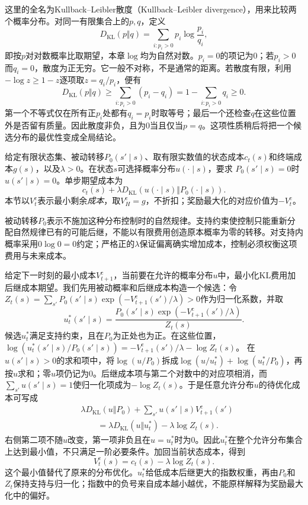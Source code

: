 这里的全名为Kullback--Leibler散度（Kullback--Leibler divergence），用来比较两个概率分布。对同一有限集合上的$p,q$，定义
\[
 D_{\mathrm{KL}}(p\Vert q)
 =\sum_{i:p_i>0}p_i\log\frac{p_i}{q_i},
\]
即按$p$对对数概率比取期望，本章$\log$均为自然对数。$p_i=0$的项记为0；若$p_i>0$而$q_i=0$，散度为正无穷。它一般不对称，不是通常的距离。若散度有限，利用$-\log z\geq1-z$逐项取$z=q_i/p_i$，便有
\[
 D_{\mathrm{KL}}(p\Vert q)
 \geq\sum_{i:p_i>0}(p_i-q_i)
 =1-\sum_{i:p_i>0}q_i\geq0.
\]
第一个不等式仅在所有正$p_i$处都有$q_i=p_i$时取等号；最后一个还检查$q$在这些位置外是否留有质量。因此散度非负，且为0当且仅当$p=q$。这项性质稍后将把一个候选分布的最优性变成全局结论。

\begin{definition}[有限时域KL控制]
 \label{def:rl-planning-kl-control}
 给定有限状态集、被动转移$P_0(s'\mid s)$、取有限实数值的状态成本$c_t(s)$和终端成本$g(s)$，以及$\lambda>0$。在状态$s$可选择概率分布$u(\cdot\mid s)$，要求
 $P_0(s'\mid s)=0$时$u(s'\mid s)=0$。单步期望成本为
 \[
 c_t(s)+\lambda D_{\mathrm{KL}}(u(\cdot\mid s)\Vert P_0(\cdot\mid s)).
 \]
 本节以$V_t^{\mathrm c}$表示最小剩余\emph{成本}，取$V_H^{\mathrm c}=g$，不折扣；奖励最大化的对应价值为$-V_t^{\mathrm c}$。
\end{definition}

被动转移$P_0$表示不施加这种分布控制时的自然规律。支持约束使控制只能重新分配自然规律已有的可能后继，不能以有限费用创造原本概率为零的转移。对支持内概率采用$0\log0=0$约定；严格正的$\lambda$保证偏离确实增加成本，控制必须权衡这项费用与未来成本。

给定下一时刻的最小成本$V_{t+1}^{\mathrm c}$，当前要在允许的概率分布$u$中，最小化KL费用加后继成本期望。我们先用被动概率和后继成本构造一个候选：令
$Z_t(s)=\sum_{s'}P_0(s'\mid s)\exp(-V_{t+1}^{\mathrm c}(s')/\lambda)>0$作为归一化系数，并取
\[
 u_t^*(s'\mid s)=
 \frac{P_0(s'\mid s)\exp(-V_{t+1}^{\mathrm c}(s')/\lambda)}{Z_t(s)}.
\]
候选$u_t^*$满足支持约束，且在$P_0$为正处也为正。在这些位置，
$\log(u_t^*(s'\mid s)/P_0(s'\mid s))=-V_{t+1}^{\mathrm c}(s')/\lambda-\log Z_t(s)$。
在$u(s'\mid s)>0$的求和项中，将$\log(u/P_0)$拆成$\log(u/u_t^*)+\log(u_t^*/P_0)$，再按$u$求和；零$u$项仍记为0。后继成本项与第二个对数中的对应项相消，而$\sum_{s'}u(s'\mid s)=1$使归一化项成为$-\log Z_t(s)$。于是任意允许分布$u$的待优化成本可写成
\begin{equation}
 \begin{aligned}
 &\lambda D_{\mathrm{KL}}(u\Vert P_0)
       +\sum_{s'}u(s'\mid s)V_{t+1}^{\mathrm c}(s')\\
 &\qquad=\lambda D_{\mathrm{KL}}(u\Vert u_t^*)-\lambda\log Z_t(s).
 \end{aligned}
 \label{eq:rl-planning-kl-completion}
\end{equation}
右侧第二项不随$u$改变，第一项非负且在$u=u_t^*$时为0。因此$u_t^*$在整个允许分布集合上达到最小值，不只满足一阶必要条件。加回当前状态成本，得到
\[
 V_t^{\mathrm c}(s)=c_t(s)-\lambda\log Z_t(s).
\]
这个最小值替代了原来的分布优化。$u_t^*$给低成本后继更大的指数权重，再由$P_0$和$Z_t$保持支持与归一化；指数中的负号来自成本越小越优，不能原样解释为奖励最大化中的偏好。

